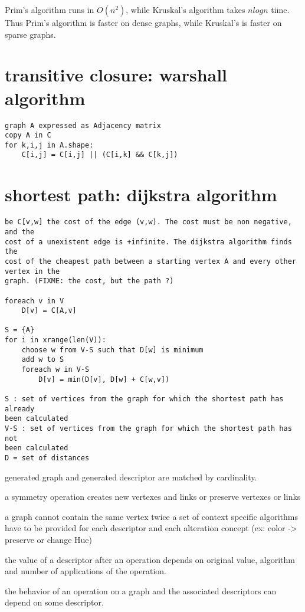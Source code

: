 Prim's algorithm runs in $O(n^2)$, while Kruskal's algorithm takes $n log n$
time. Thus Prim's algorithm is faster on dense graphs, while Kruskal's is
faster on sparse graphs. 

\section{transitive closure: warshall algorithm}

\begin{verbatim}
graph A expressed as Adjacency matrix 
copy A in C
for k,i,j in A.shape:
    C[i,j] = C[i,j] || (C[i,k] && C[k,j])
\end{verbatim}


\section{shortest path: dijkstra algorithm}

\begin{verbatim}
be C[v,w] the cost of the edge (v,w). The cost must be non negative, and the
cost of a unexistent edge is +infinite. The dijkstra algorithm finds the
cost of the cheapest path between a starting vertex A and every other vertex in the
graph. (FIXME: the cost, but the path ?)

foreach v in V
    D[v] = C[A,v]

S = {A}
for i in xrange(len(V)):
    choose w from V-S such that D[w] is minimum
    add w to S
    foreach w in V-S
        D[v] = min(D[v], D[w] + C[w,v])

S : set of vertices from the graph for which the shortest path has already
been calculated
V-S : set of vertices from the graph for which the shortest path has not
been calculated
D = set of distances 

\end{verbatim}

generated graph and generated descriptor are matched by cardinality.

a symmetry operation creates new vertexes and links or preserve vertexes or
links

a graph cannot contain the same vertex twice
a set of context specific algorithms have to be provided for each descriptor
and each alteration concept (ex: color -> preserve or change Hue)

the value of a descriptor after an operation depends on original value,
algorithm and number of applications of the operation.

the behavior of an operation on a graph and the associated descriptors can
depend on some descriptor.

